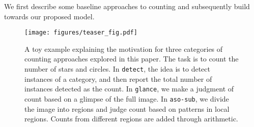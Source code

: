 \documentclass[10pt,twocolumn,letterpaper]{article}
\newcommand{\detect}{\texttt{detect}\xspace}
\newcommand{\sub}{\texttt{aso-sub}\xspace}
\newcommand{\glance}{\texttt{glance}\xspace}
\begin{document}
We first describe some baseline approaches to counting and subsequently build towards our proposed model.








\begin{figure}
\texttt{[image: figures/teaser\_fig.pdf]}
\vspace{-15pt}
\caption{\footnotesize{A toy example explaining the motivation for three categories of counting approaches explored in this paper. The task is to count the number of stars and circles. In \detect, the idea is to detect instances of a category, and then report the total number of instances detected as the count. In \glance, we make a judgment of count based on a glimpse of the full image. In \sub, we divide the image into regions and judge count based on patterns in local regions. Counts from different regions are added through arithmetic.}}
\label{fig:2}
\vspace{-20pt}
\end{figure}



\begin{comment}
Problem Setup
\begin{itemize}
\item We study the problem of counting objects in images
\item Interesting as a scene understanding problem
\item Useful for various applications: visual question answering, complementing other recognition tasks etc.
\item Requires a more fine grained understanding of the image than classification
\item People have explored tasks like detection, and segmentation to make things more fine grained
\item This problem is an orthogonal fine grained problem
\end{itemize}
\end{comment}
\end{document}

